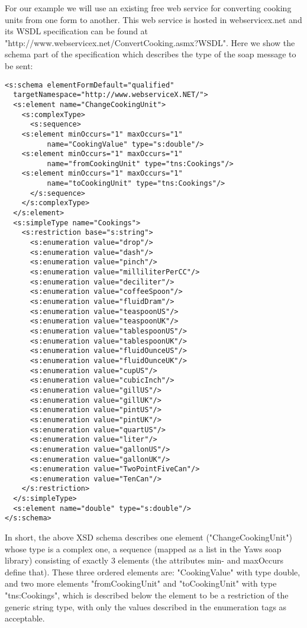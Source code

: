 \documentclass[submission,copyright]{eptcs}
\begin{document}
For our example we will use an existing free web service for converting cooking units from one form to another. This web service is hosted in webservicex.net and its WSDL specification can be found at "http://www.webservicex.net/ConvertCooking.asmx?WSDL". Here we show the schema part of the specification which describes the type of the soap message to be sent:

\begin{lstlisting}
<s:schema elementFormDefault="qualified"
  targetNamespace="http://www.webserviceX.NET/">
  <s:element name="ChangeCookingUnit">
    <s:complexType>
      <s:sequence>
	<s:element minOccurs="1" maxOccurs="1" 
          name="CookingValue" type="s:double"/>
	<s:element minOccurs="1" maxOccurs="1"
          name="fromCookingUnit" type="tns:Cookings"/>
	<s:element minOccurs="1" maxOccurs="1" 
          name="toCookingUnit" type="tns:Cookings"/>
      </s:sequence>
    </s:complexType>
  </s:element>
  <s:simpleType name="Cookings">
    <s:restriction base="s:string">
      <s:enumeration value="drop"/>
      <s:enumeration value="dash"/>
      <s:enumeration value="pinch"/>
      <s:enumeration value="milliliterPerCC"/>
      <s:enumeration value="deciliter"/>
      <s:enumeration value="coffeeSpoon"/>
      <s:enumeration value="fluidDram"/>
      <s:enumeration value="teaspoonUS"/>
      <s:enumeration value="teaspoonUK"/>
      <s:enumeration value="tablespoonUS"/>
      <s:enumeration value="tablespoonUK"/>
      <s:enumeration value="fluidOunceUS"/>
      <s:enumeration value="fluidOunceUK"/>
      <s:enumeration value="cupUS"/>
      <s:enumeration value="cubicInch"/>
      <s:enumeration value="gillUS"/>
      <s:enumeration value="gillUK"/>
      <s:enumeration value="pintUS"/>
      <s:enumeration value="pintUK"/>
      <s:enumeration value="quartUS"/>
      <s:enumeration value="liter"/>
      <s:enumeration value="gallonUS"/>
      <s:enumeration value="gallonUK"/>
      <s:enumeration value="TwoPointFiveCan"/>
      <s:enumeration value="TenCan"/>
    </s:restriction>
  </s:simpleType>
  <s:element name="double" type="s:double"/>
</s:schema>

\end{lstlisting}

In short, the above XSD schema describes one element ("ChangeCookingUnit") whose type is a complex one, a sequence (mapped as a list in the Yaws soap library) consisting of exactly 3 elements (the attributes min- and maxOccurs define that). These three ordered elements are: "CookingValue" with type double, and two more elements "fromCookingUnit" and "toCookingUnit" with type "tns:Cookings", which is described below the element to be a restriction of the generic string type, with only the values described in the enumeration tags as acceptable. 
\end{document}
